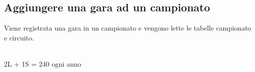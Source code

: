 \documentclass[a4paper,12pt]{report}
\begin{document}
			\subsection{Aggiungere una gara ad un campionato}
			{\fontsize{12.5}{20}\selectfont
			Viene registrata una gara in un campionato e vengono lette le tabelle campionato e circuito.}
			\begin{table}[!htb]
				\centering
				\begin{center}
				\newline\\
				2L + 1S = 240 ogni anno\\
				\end{center}
			\end{table}\\
			\pagebreak
\end{document}
